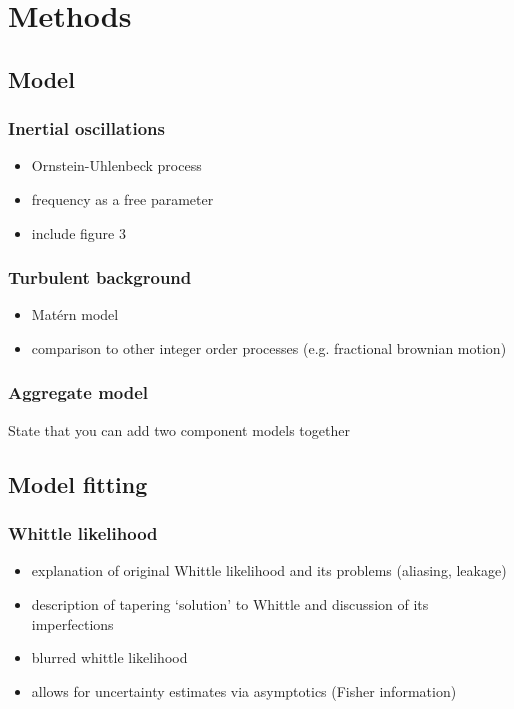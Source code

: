 \documentclass{stat572Style}
\begin{document}
\section{Methods}

	\subsection{Model}
		\subsubsection{Inertial oscillations}
			\begin{itemize}
				\item Ornstein-Uhlenbeck process 
				\item frequency as a free parameter
				\item include figure 3 
			\end{itemize}
		
		\subsubsection{Turbulent background}
				\begin{itemize}
					\item Mat\'{e}rn model 
					\item comparison to other integer order processes (e.g. fractional brownian motion)
				\end{itemize}
		
		\subsubsection{Aggregate model}
			State that you can add two component models together
	
	\subsection{Model fitting}
		\subsubsection{Whittle likelihood}
			\begin{itemize}
				\item explanation of original Whittle likelihood and its problems (aliasing, leakage)
				\item description of tapering `solution' to Whittle and discussion of its imperfections
				\item blurred whittle likelihood 
				\item allows for uncertainty estimates via asymptotics (Fisher information)
			\end{itemize}
	
\end{document}

